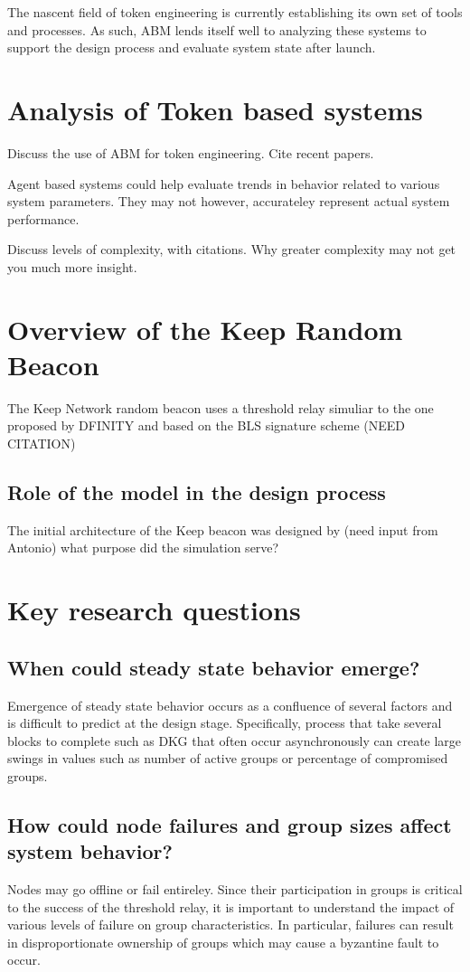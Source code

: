 \documentclass[conference]{IEEEtran}
\begin{document}
The nascent field of token engineering is currently establishing its own set 
of tools and processes. As such, ABM lends itself well to analyzing these systems
to support the design process and evaluate system state after launch.

\section{Analysis of Token based systems}


Discuss the use of ABM for token engineering. Cite recent papers.

Agent based systems could help evaluate trends in behavior related to
various system parameters. They may not however, accurateley represent 
actual system performance. 

Discuss levels of complexity, with citations. Why greater complexity may
not get you much more insight.

\section{Overview of the Keep Random Beacon}
The Keep Network random beacon uses a threshold relay simuliar to the one proposed
by DFINITY and based on the BLS signature scheme \cite{} (NEED CITATION)

\subsection{Role of the model in the design process}
The initial architecture of the Keep beacon was designed by (need input from Antonio)
what purpose did the simulation serve?

\section{Key research questions}
\subsection{When could steady state behavior emerge?}
Emergence of steady state behavior occurs as a confluence of several factors and is difficult
to predict at the design stage. Specifically, process that take several blocks to complete 
such as DKG that often occur asynchronously can create large swings in values such as number of active
groups or percentage of compromised groups. 

\subsection{How could node failures and group sizes affect system behavior?}
Nodes may go offline or fail entireley. Since their participation in groups is critical to the 
success of the threshold relay, it is important to understand the impact of various levels
of failure on group characteristics. In particular, failures can result in disproportionate ownership
of groups which may cause a byzantine fault to occur. 
\end{document}
